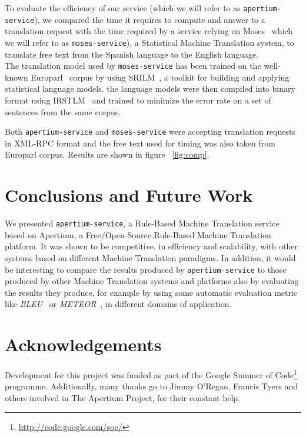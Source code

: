 \documentclass[11pt]{article}
\begin{document}
To evaluate the efficiency of our service (which we will refer to as {\tt apertium-service}), we compared the time it requires to compute and answer to a translation request with the time required by a service relying on Moses~\citep{moses} which we will refer to as {\tt moses-service}), a Statistical Machine Translation system, to translate free text from the Spanish language to the English language.\\

The translation model used by {\tt moses-service} has been trained on the well-known Europarl~\citep{europarl} corpus by using SRILM~\citep{srilm}, a toolkit for building and applying statistical language models. the language models were then compiled into binary format using IRSTLM~\citep{irstlm} and trained to minimize the error rate on a set of sentences from the same corpus. 

Both {\tt apertium-service} and {\tt moses-service} were accepting translation requests in XML-RPC format and the free text used for timing was also taken from Europarl corpus. Results are shown in figure ~\ref{fig:comp}.


\section{Conclusions and Future Work}

We presented {\tt apertium-service}, a Rule-Based Machine Translation service based on Apertium, a Free/Open-Source Rule-Based Machine Translation platform. It was shown to be competitive, in efficiency and scalability, with other systems based on different Machine Translation paradigms. In addition, it would be interesting to compare the results produced by {\tt apertium-service} to those produced by other Machine Translation systems and platforms also by evaluating the results they produce, for example by using some automatic evaluation metric like \emph{BLEU}~\citep{bleu} or \emph{METEOR}~\citep{meteor}, in different domains of application.


\section*{Acknowledgements}

Development for this project was funded as part of the Google Summer of Code\footnote{\url{http://code.google.com/soc/}} programme. 
Additionally, many thanks go to Jimmy O'Regan, Francis Tyers and others involved in The Apertium Project, for their constant help.




\end{document}
